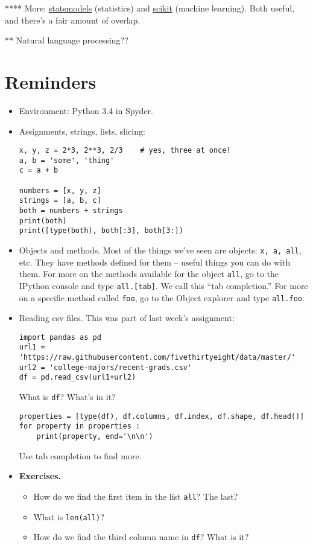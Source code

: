 \documentclass[11pt]{article}
\begin{document}
**** More:
\href{http://statsmodels.sourceforge.net/}{statsmodels} (statistics)
and
\href{http://scikit-learn.org/stable/}{scikit} (machine learning).
Both useful, and there's a fair amount of overlap.

** Natural language processing??


\section{Reminders}

\begin{itemize}
\item Environment:  Python 3.4 in Spyder.
\item Assignments, strings, lists, slicing:
\begin{verbatim}
x, y, z = 2*3, 2**3, 2/3    # yes, three at once!
a, b = 'some', 'thing'
c = a + b

numbers = [x, y, z]
strings = [a, b, c]
both = numbers + strings
print(both)
print([type(both), both[:3], both[3:])
\end{verbatim}

\item Objects and methods.  Most of the things we've seen are objects:  {\tt x, a, all}, etc.
They have methods defined for them -- useful things you can do with them.
For more on the methods available for the object {\tt all},
go to the IPython console and type {\tt all.[tab]}.
We call this ``tab completion.''
For more on a specific method called {\tt foo},
go to the Object explorer and type {\tt all.foo}.

\item Reading csv files.
This was part of last week's assignment:
\begin{verbatim}
import pandas as pd
url1 = 'https://raw.githubusercontent.com/fivethirtyeight/data/master/'
url2 = 'college-majors/recent-grads.csv'
df = pd.read_csv(url1+url2)
\end{verbatim}
What is {\tt df}?  What's in it?
\begin{verbatim}
properties = [type(df), df.columns, df.index, df.shape, df.head()]
for property in properties :
    print(property, end='\n\n')
\end{verbatim}
Use tab completion to find more.


\item {\bf Exercises.}
\begin{itemize}
\item How do we find the first item in the list {\tt all}?  The last?
\item What is {\tt len(all)}?
\item How do we find the third column name in {\tt df}?  What is it?
\end{itemize}

\end{itemize}
\end{document}
